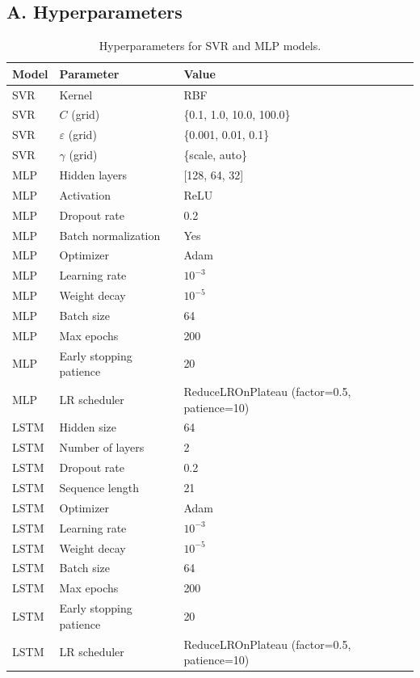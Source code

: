 \documentclass{article}
\begin{document}
\subsection*{A. Hyperparameters}

\begin{table}[h]
  \caption{Hyperparameters for SVR and MLP models.}
  \label{tab:hyperparams}
  \centering
  \begin{tabular}{lll}
    \toprule
    Model & Parameter & Value \\
    \midrule
    SVR & Kernel & RBF \\
    SVR & $C$ (grid) & \{0.1, 1.0, 10.0, 100.0\} \\
    SVR & $\varepsilon$ (grid) & \{0.001, 0.01, 0.1\} \\
    SVR & $\gamma$ (grid) & \{scale, auto\} \\
    \midrule
    MLP & Hidden layers & [128, 64, 32] \\
    MLP & Activation & ReLU \\
    MLP & Dropout rate & 0.2 \\
    MLP & Batch normalization & Yes \\
    MLP & Optimizer & Adam \\
    MLP & Learning rate & $10^{-3}$ \\
    MLP & Weight decay & $10^{-5}$ \\
    MLP & Batch size & 64 \\
    MLP & Max epochs & 200 \\
    MLP & Early stopping patience & 20 \\
    MLP & LR scheduler & ReduceLROnPlateau (factor=0.5, patience=10) \\
    \midrule
    LSTM & Hidden size & 64 \\
    LSTM & Number of layers & 2 \\
    LSTM & Dropout rate & 0.2 \\
    LSTM & Sequence length & 21 \\
    LSTM & Optimizer & Adam \\
    LSTM & Learning rate & $10^{-3}$ \\
    LSTM & Weight decay & $10^{-5}$ \\
    LSTM & Batch size & 64 \\
    LSTM & Max epochs & 200 \\
    LSTM & Early stopping patience & 20 \\
    LSTM & LR scheduler & ReduceLROnPlateau (factor=0.5, patience=10) \\
    \bottomrule
  \end{tabular}
\end{table}
\end{document}
